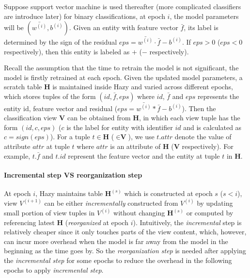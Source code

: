 Suppose support vector machine is used thereafter (more complicated classifiers are introduce later) for binary classifications, at epoch $i$, the model parameters will be $(\bar{w^{(i)}}, b^{(i)})$. Given an entity with feature vector $\bar{f}$, its label is determined by the sign of the residual $eps = \bar{w^{(i)}}\cdot\bar{f}-b^{(i)}$. If $eps > 0$ ($eps < 0$ respectively), then this entity is labeled as $+$ ($-$ respectively).

Recall the assumption that the time to retrain the model is not significant, the model is firstly retrained at each epoch. Given the updated model parameters, a scratch table $\textbf{H}$ is maintained inside Hazy and varied across different epochs, which stores tuples of the form $(id, \bar{f}, eps)$ where $id$, $\bar{f}$ and $eps$ represents the entity id, feature vector and residual ($eps = \bar{w^{(i)}}*\bar{f}-b^{(i)}$). Then the classification view $\textbf{V}$ can be obtained from $\textbf{H}$, in which each view tuple has the form $(id, c, eps)$ ($c$ is the label for entity with identifier $id$ and is calculated as $c=sign(eps)$). For a tuple $t \in \textbf{H}$ ($\in \textbf{V}$), we use $t.attr$ denote the value of attribute $attr$ at tuple $t$ where $attr$ is an attribute of $\textbf{H}$ ($\textbf{V}$ respectively). For example, $t.\bar{f}$ and $t.id$ represent the feature vector and the entity at tuple $t$ in $\textbf{H}$.

\paragraph{Incremental step VS reorganization step} At epoch $i$, Hazy maintains table $\textbf{H}^{(s)}$ which is constructed at epoch $s$ ($s < i$), view $V^{(i+1)}$ can be either {\em incrementally} constructed from $V^{(i)}$ by updating small portion of view tuples in $V^{(i)}$ without changing $\textbf{H}^{(s)}$ or computed by referencing latest $\textbf{H}$ ({\em reorganized} at epoch $i$). Intuitively, the {\em incremental} step is relatively cheaper since it only touches parts of the view content, which, however, can incur more overhead when the model is far away from the model in the beginning as the time goes by. So the {\em reorganization step} is needed after applying the {\em incremental step} for some epochs to reduce the overhead in the following epochs to apply {\em incremental step}.


